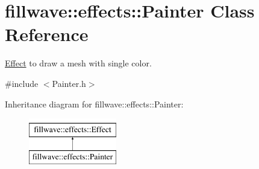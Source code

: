 \hypertarget{classfillwave_1_1effects_1_1Painter}{}\section{fillwave\+:\+:effects\+:\+:Painter Class Reference}
\label{classfillwave_1_1effects_1_1Painter}


\hyperlink{classfillwave_1_1effects_1_1Effect}{Effect} to draw a mesh with single color.  




{\ttfamily \#include $<$Painter.\+h$>$}

Inheritance diagram for fillwave\+:\+:effects\+:\+:Painter\+:\begin{figure}[H]
\begin{center}
\leavevmode
\includegraphics[height=2.000000cm]{classfillwave_1_1effects_1_1Painter}
\end{center}
\end{figure}
